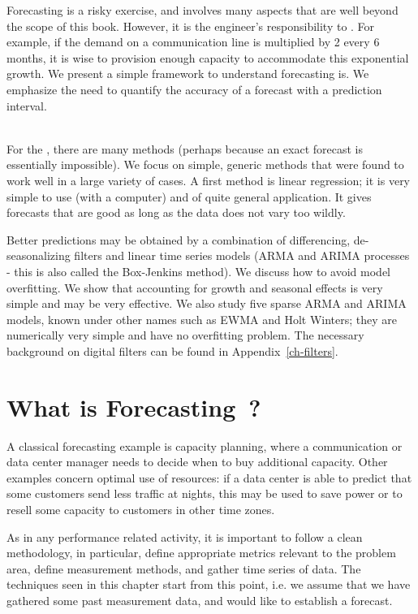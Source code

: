 \begin{minipage}[b]{0.5\textwidth}
Forecasting is a risky exercise, and involves many aspects that are
well beyond the scope of this book. However, it is the engineer's
responsibility to . For example,
if the demand on a communication line is multiplied by 2 every 6
months, it is wise to provision enough capacity to accommodate this
exponential growth. We present a simple framework to understand
 forecasting is. We emphasize the need to quantify the
accuracy of a forecast with a prediction interval.
\end{minipage}
%
\hfill {}\\
%
For the
, there are many methods (perhaps because an exact forecast
is essentially impossible). We focus on simple, generic methods that
were found to work well in a large variety of cases. A first method
is linear regression; it is very simple to use (with a computer) and
of quite general application. It gives forecasts that are good as
long as the data does not vary too wildly.

Better predictions may be obtained by a combination of
differencing, de-seasonalizing filters and linear time series
models (ARMA and ARIMA processes - this is also called the
Box-Jenkins method). We discuss how to avoid model overfitting.
We show that accounting for growth and seasonal effects is very
simple and may be very effective. We also study five sparse
ARMA and ARIMA models, known under other names such as EWMA and
Holt Winters; they are numerically very simple and have no
overfitting problem. The necessary background on digital
filters can be found in Appendix~\ref{ch-filters}. \minitoc
%
\section{What is Forecasting~?}
A classical forecasting example is capacity planning, where a
communication or data center manager needs to decide when to
buy additional capacity. Other examples concern optimal use of
resources: if a data center is able to predict that some
customers send less traffic at nights, this may be used to save
power or to resell some capacity to customers in other time
zones.

As in any performance related activity, it is
important to follow a clean methodology, in
particular, define appropriate metrics relevant to the
problem area, define measurement methods, and gather
time series of data. The techniques seen in this
chapter start from this point, i.e. we assume that we
have gathered some past measurement data, and would
like to establish a forecast.


